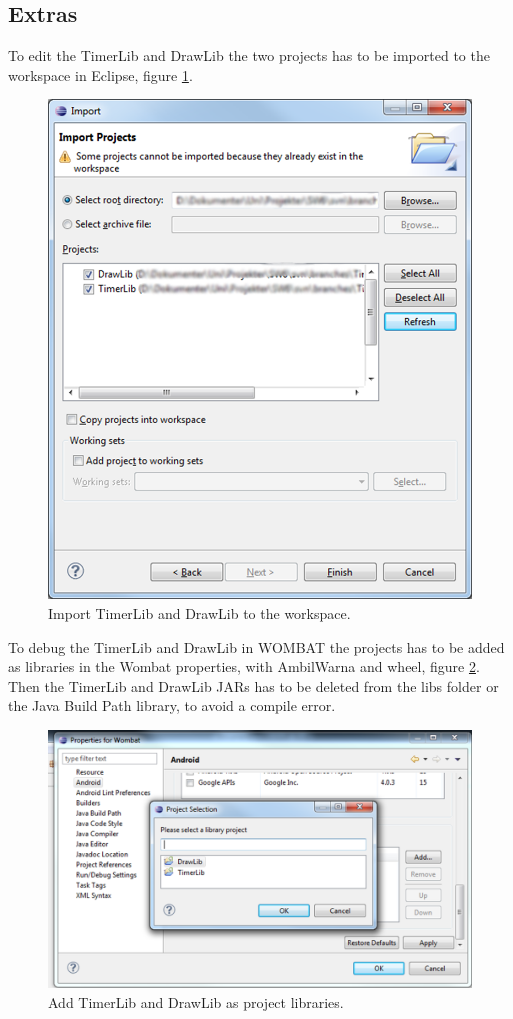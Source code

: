 \subsection*{Extras}
To edit the TimerLib and DrawLib the two projects has to be imported to the workspace in Eclipse, figure \ref{fig:import2}.

\begin{figure}[H]
	\centering
		\includegraphics[scale=0.22]{Images/how_to_wombat/import2.png}
	\caption{Import TimerLib and DrawLib to the workspace.}
	\label{fig:import2}
\end{figure}

To debug the TimerLib and DrawLib in WOMBAT the projects has to be added as libraries in the Wombat properties, with AmbilWarna and wheel, figure \ref{fig:add_timer_draw_lib}.
Then the TimerLib and DrawLib JARs has to be deleted from the libs folder or the Java Build Path library, to avoid a compile error.

\begin{figure}[H]
	\centering
		\includegraphics[scale=0.2]{Images/how_to_wombat/add_timer_draw_lib.png}
	\caption{Add TimerLib and DrawLib as project libraries.}
	\label{fig:add_timer_draw_lib}
\end{figure}
